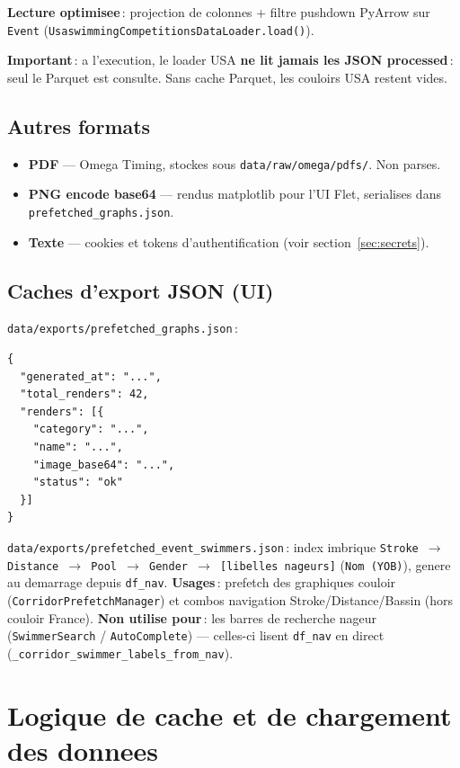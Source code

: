 \documentclass[11pt,a4paper]{article}
\begin{document}
\textbf{Lecture optimisee}\,: projection de colonnes + filtre pushdown PyArrow sur \texttt{Event} (\texttt{UsaswimmingCompetitionsDataLoader.load()}).

\textbf{Important}\,: a l'execution, le loader USA \textbf{ne lit jamais les JSON processed}\,: seul le Parquet est consulte. Sans cache Parquet, les couloirs USA restent vides.

\subsection{Autres formats}

\begin{itemize}
  \item \textbf{PDF} --- Omega Timing, stockes sous \texttt{data/raw/omega/pdfs/}. Non parses.
  \item \textbf{PNG encode base64} --- rendus matplotlib pour l'UI Flet, serialises dans \texttt{prefetched\_graphs.json}.
  \item \textbf{Texte} --- cookies et tokens d'authentification (voir section~\ref{sec:secrets}).
\end{itemize}

\subsection{Caches d'export JSON (UI)}

\texttt{data/exports/prefetched\_graphs.json}\,:
\begin{lstlisting}
{
  "generated_at": "...",
  "total_renders": 42,
  "renders": [{
    "category": "...",
    "name": "...",
    "image_base64": "...",
    "status": "ok"
  }]
}
\end{lstlisting}

\texttt{data/exports/prefetched\_event\_swimmers.json}\,:
index imbrique \texttt{Stroke $\rightarrow$ Distance $\rightarrow$ Pool $\rightarrow$ Gender $\rightarrow$ [libelles nageurs]} (\texttt{Nom (YOB)}), genere au demarrage depuis \texttt{df\_nav}.
\textbf{Usages}\,: prefetch des graphiques couloir (\texttt{CorridorPrefetchManager}) et combos navigation Stroke/Distance/Bassin (hors couloir France).
\textbf{Non utilise pour}\,: les barres de recherche nageur (\texttt{SwimmerSearch} / \texttt{AutoComplete}) --- celles-ci lisent \texttt{df\_nav} en direct (\texttt{\_corridor\_swimmer\_labels\_from\_nav}).

\section{Logique de cache et de chargement des donnees}
\end{document}
